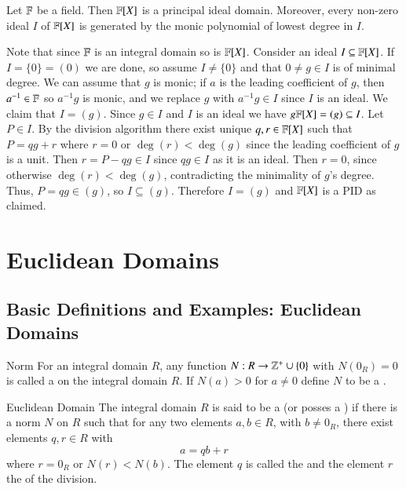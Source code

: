 \documentclass[12pt, a4paper, twoside, openright, titlepage]{book}
\begin{document}
\begin{thm}{}{}
    Let $\mathbb F$ be a field. Then $\mathbb F[X]$ is a principal ideal domain. Moreover, every non-zero ideal $I$ of $\mathbb F[X]$ is generated by the monic polynomial of lowest degree in $I$.
\end{thm}
\begin{proof*}{}{}
    Note that since $\mathbb F$ is an integral domain so is $\mathbb F[X]$. Consider an ideal $I \subseteq \mathbb F[X]$. If $I = \{0\} = (0)$ we are done, so assume $I \neq \{0\}$ and that $0 \neq g \in I$ is of minimal degree. We can assume that $g$ is monic; if $a$ is the leading coefficient of $g$, then $a^{-1} \in \mathbb F$ so $a^{-1}g$ is monic, and we replace $g$ with $a^{-1}g \in I$ since $I$ is an ideal. We claim that $I = (g)$. Since $g \in I$ and $I$ is an ideal we have $g\mathbb F[X] = (g) \subseteq I$. Let $P \in I$. By the division algorithm there exist unique $q,r \in \mathbb F[X]$ such that $P = qg + r$ where $r = 0$ or $\deg(r) < \deg(g)$ since the leading coefficient of $g$ is a unit. Then $r = P - qg \in I$ since $qg \in I$ as it is an ideal. Then $r = 0$, since otherwise $\deg(r) < \deg(g)$, contradicting the minimality of $g$'s degree. Thus, $P = qg \in (g)$, so $I \subseteq (g)$. Therefore $I = (g)$ and $\mathbb F[X]$ is a PID as claimed.
\end{proof*}



\chapter{\textsection\textsection Euclidean Domains}

\section{\textsection Basic Definitions and Examples: Euclidean Domains}

\begin{defn}{Norm}{}
    For an integral domain $R$, any function $N:R\rightarrow \mathbb Z^+\cup\{0\}$ with $N(0_R) = 0$ is called a  on the integral domain $R$. If $N(a) > 0$ for $a \neq 0$ define $N$ to be a .
\end{defn}

\begin{defn}{Euclidean Domain}{}
    The integral domain $R$ is said to be a  (or posses a ) if there is a norm $N$ on $R$ such that for any two elements $a,b \in R$, with $b \neq 0_R$, there exist elements $q,r \in R$ with $$a= qb+r$$ where $r = 0_R$ or $N(r) < N(b)$. The element $q$ is called the  and the element $r$ the  of the division.
\end{defn}
\end{document}
